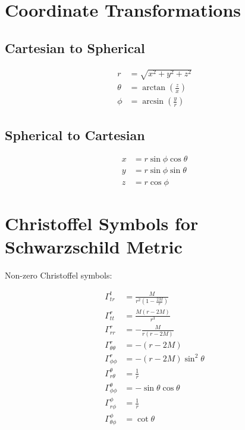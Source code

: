 \documentclass[12pt,a4paper]{article}
\theoremstyle{definition}
\theoremstyle{remark}
\begin{document}
\section{Coordinate Transformations}

\subsection{Cartesian to Spherical}

\begin{align}
    r &= \sqrt{x^2 + y^2 + z^2} \\
    \theta &= \arctan\left(\frac{z}{x}\right) \\
    \phi &= \arcsin\left(\frac{y}{r}\right)
\end{align}

\subsection{Spherical to Cartesian}

\begin{align}
    x &= r\sin\phi\cos\theta \\
    y &= r\sin\phi\sin\theta \\
    z &= r\cos\phi
\end{align}

\section{Christoffel Symbols for Schwarzschild Metric}

Non-zero Christoffel symbols:

\begin{align}
    \Gamma^t_{tr} &= \frac{M}{r^2\left(1 - \frac{2M}{r}\right)} \\
    \Gamma^r_{tt} &= \frac{M(r - 2M)}{r^3} \\
    \Gamma^r_{rr} &= -\frac{M}{r(r - 2M)} \\
    \Gamma^r_{\theta\theta} &= -(r - 2M) \\
    \Gamma^r_{\phi\phi} &= -(r - 2M)\sin^2\theta \\
    \Gamma^\theta_{r\theta} &= \frac{1}{r} \\
    \Gamma^\theta_{\phi\phi} &= -\sin\theta\cos\theta \\
    \Gamma^\phi_{r\phi} &= \frac{1}{r} \\
    \Gamma^\phi_{\theta\phi} &= \cot\theta
\end{align}
\end{document}
